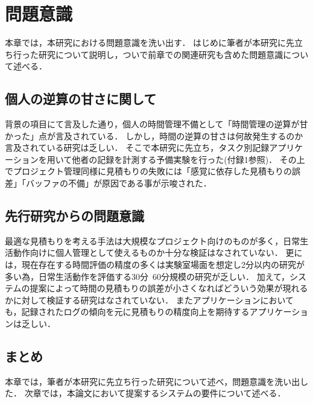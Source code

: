 \chapter{問題意識}
本章では，本研究における問題意識を洗い出す．
はじめに筆者が本研究に先立ち行った研究について説明し，ついで前章での関連研究も含めた問題意識について述べる．

\section{個人の逆算の甘さに関して}
背景の項目にて言及した通り，個人の時間管理不備として「時間管理の逆算が甘かった」点が言及されている．
しかし，時間の逆算の甘さは何故発生するのか言及されている研究は乏しい．
そこで本研究に先立ち，タスク別記録アプリケーションを用いて他者の記録を計測する予備実験を行った(付録1参照)．
その上でプロジェクト管理同様に見積もりの失敗には「感覚に依存した見積もりの誤差」「バッファの不備」が原因である事が示唆された．

\section{先行研究からの問題意識}
最適な見積もりを考える手法は大規模なプロジェクト向けのものが多く，日常生活動作向けに個人管理として使えるものか十分な検証はなされていない．
更には，現在存在する時間評価の精度の多くは実験室場面を想定し2分以内の研究が多い為，日常生活動作を評価する30分~60分規模の研究が乏しい．
加えて，システムの提案によって時間の見積もりの誤差が小さくなればどういう効果が現れるかに対して検証する研究はなされていない．
またアプリケーションにおいても，記録されたログの傾向を元に見積もりの精度向上を期待するアプリケーションは乏しい．

\section{まとめ}
本章では，筆者が本研究に先立ち行った研究について述べ，問題意識を洗い出した．
次章では，本論文において提案するシステムの要件について述べる．